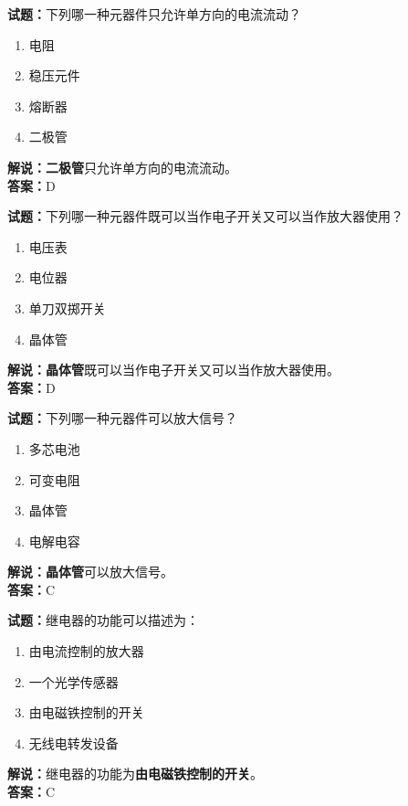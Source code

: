 \documentclass{ctexbook}
\begin{document}
\vspace{1em}

\textbf{试题：}下列哪一种元器件只允许单方向的电流流动？
\begin{enumerate}[leftmargin=3em]
  \item 电阻
  \item 稳压元件
  \item 熔断器
  \item 二极管
\end{enumerate}
\noindent\textbf{解说：}\textbf{二极管}只允许单方向的电流流动。\\\noindent\textbf{答案：}D

\vspace{1em}

\textbf{试题：}下列哪一种元器件既可以当作电子开关又可以当作放大器使用？
\begin{enumerate}[leftmargin=3em]
  \item 电压表
  \item 电位器
  \item 单刀双掷开关
  \item 晶体管
\end{enumerate}
\noindent\textbf{解说：}\textbf{晶体管}既可以当作电子开关又可以当作放大器使用。\\\noindent\textbf{答案：}D

\vspace{1em}

\textbf{试题：}下列哪一种元器件可以放大信号？
\begin{enumerate}[leftmargin=3em]
  \item 多芯电池
  \item 可变电阻
  \item 晶体管
  \item 电解电容
\end{enumerate}
\noindent\textbf{解说：}\textbf{晶体管}可以放大信号。\\\noindent\textbf{答案：}C

\vspace{1em}

\textbf{试题：}继电器的功能可以描述为：
\begin{enumerate}[leftmargin=3em]
  \item 由电流控制的放大器
  \item 一个光学传感器
  \item 由电磁铁控制的开关
  \item 无线电转发设备
\end{enumerate}
\noindent\textbf{解说：}继电器的功能为\textbf{由电磁铁控制的开关}。\\\noindent\textbf{答案：}C
\end{document}
